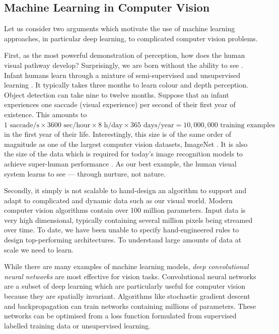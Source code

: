 \subsection{Machine Learning in Computer Vision}

Let us consider two arguments which motivate the use of machine learning approaches, in particular deep learning, to complicated computer vision problems.

First, as the most powerful demonstration of perception, how does the human visual pathway develop? Surprisingly, we are born without the ability to see \citep{gibson1960visual}. Infant humans learn through a mixture of semi-supervised and unsupervised learning \citep{kellman2006infant}. It typically takes three months to learn colour and depth perception. Object detection can take nine to twelve months. Suppose that an infant experiences one saccade (visual experience) per second of their first year of existence. This amounts to $1 \text{~saccade/s} \times 3600 \text{~sec/hour} \times 8 \text{~h/day} \times 365 \text{~days/year} = 10,000,000 \text{~training examples}$ in the first year of their life. Interestingly, this size is of the same order of magnitude as one of the largest computer vision datasets, ImageNet \citep{deng2009imagenet}. It is also the size of the data which is required for today’s image recognition models to achieve super-human performance \citep{he2016deep}. As our best example, the human visual system learns to see --- through nurture, not nature.

Secondly, it simply is not scalable to hand-design an algorithm
to support and adapt to complicated and dynamic data such as our visual world. Modern computer vision algorithms contain over 100 million parameters. Input data is very high dimensional, typically containing several million pixels being streamed over time. To date, we have been unable to specify hand-engineered rules to design top-performing architectures. To understand large amounts of data at scale we need to learn.

While there are many examples of machine learning models, \textit{deep convolutional neural networks} \citep{Fukushima1979neocognitron,krizhevsky2012imagenet} are most effective for vision tasks. Convolutional neural networks are a subset of deep learning which are particularly useful for computer vision because they are spatially invariant. Algorithms like stochastic gradient descent \citep{kiefer1952stochastic} and backpropagation \citep{rumelhart1986learning} can train networks containing millions of parameters. These networks can be optimised from a loss function formulated from supervised labelled training data or unsupervised learning.

